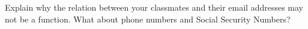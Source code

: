 {Explain why the relation between your classmates and their email addresses may not be a function.  What about phone numbers and Social Security Numbers?}
{}